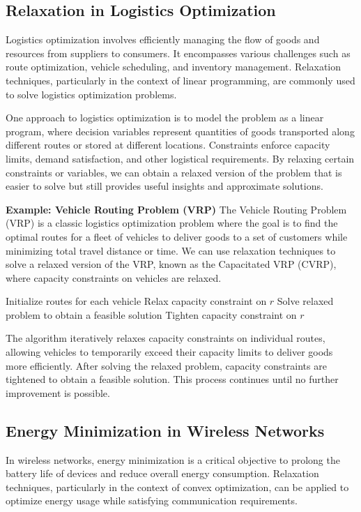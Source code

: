 \documentclass[12pt]{book} %
\begin{document}
\subsection{Relaxation in Logistics Optimization}
Logistics optimization involves efficiently managing the flow of goods and resources from suppliers to consumers. It encompasses various challenges such as route optimization, vehicle scheduling, and inventory management. Relaxation techniques, particularly in the context of linear programming, are commonly used to solve logistics optimization problems.

One approach to logistics optimization is to model the problem as a linear program, where decision variables represent quantities of goods transported along different routes or stored at different locations. Constraints enforce capacity limits, demand satisfaction, and other logistical requirements. By relaxing certain constraints or variables, we can obtain a relaxed version of the problem that is easier to solve but still provides useful insights and approximate solutions.

\textbf{Example: Vehicle Routing Problem (VRP)}
The Vehicle Routing Problem (VRP) is a classic logistics optimization problem where the goal is to find the optimal routes for a fleet of vehicles to deliver goods to a set of customers while minimizing total travel distance or time. We can use relaxation techniques to solve a relaxed version of the VRP, known as the Capacitated VRP (CVRP), where capacity constraints on vehicles are relaxed.
\FloatBarrier
\begin{algorithm}
\caption{Relaxation-based Heuristic for CVRP}
\begin{algorithmic}[1]
\State Initialize routes for each vehicle
\Repeat
        \State Relax capacity constraint on $r$
        \State Solve relaxed problem to obtain a feasible solution
        \State Tighten capacity constraint on $r$
    \EndFor
{}
\end{algorithmic}
\end{algorithm}
\FloatBarrier
The algorithm iteratively relaxes capacity constraints on individual routes, allowing vehicles to temporarily exceed their capacity limits to deliver goods more efficiently. After solving the relaxed problem, capacity constraints are tightened to obtain a feasible solution. This process continues until no further improvement is possible.

\subsection{Energy Minimization in Wireless Networks}
In wireless networks, energy minimization is a critical objective to prolong the battery life of devices and reduce overall energy consumption. Relaxation techniques, particularly in the context of convex optimization, can be applied to optimize energy usage while satisfying communication requirements.
\end{document}
